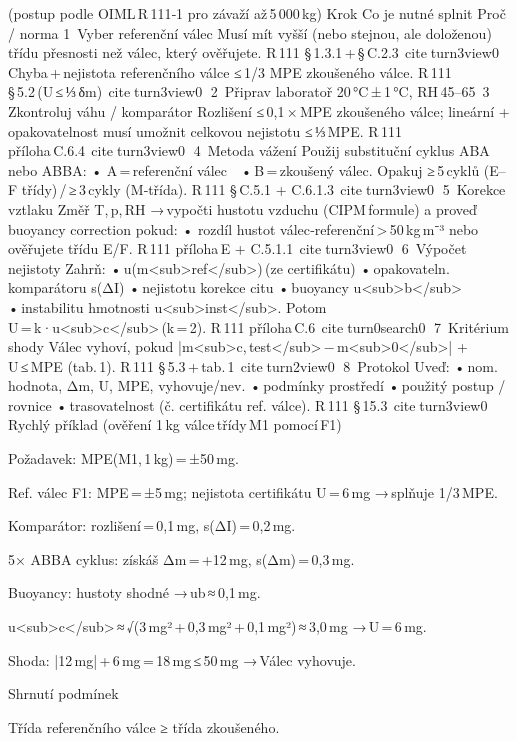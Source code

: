 (postup podle OIML R 111‑1 pro závaží až 5 000 kg)
Krok	Co je nutné splnit	Proč / norma
1  Vyber referenční válec	Musí mít vyšší (nebo stejnou, ale doloženou) třídu přesnosti než válec, který ověřujete.	R 111 § 1.3.1 + § C.2.3 citeturn3view0
	Chyba + nejistota referenčního válce ≤ 1/3 MPE zkoušeného válce.	R 111 § 5.2 (U ≤ ⅓ δm) citeturn3view0
2  Připrav laboratoř	20 °C ± 1 °C, RH 45–65 %
3  Zkontroluj váhu / komparátor	Rozlišení ≤ 0,1 × MPE zkoušeného válce; lineární + opakovatelnost musí umožnit celkovou nejistotu ≤ ⅓ MPE.	R 111 příloha C.6.4 citeturn3view0
4  Metoda vážení	Použij substituční cyklus ABA nebo ABBA:
• A = referenční válec • B = zkoušený válec.
Opakuj ≥ 5 cyklů (E–F třídy) / ≥ 3 cykly (M‑třída).	R 111 § C.5.1 + C.6.1.3 citeturn3view0
5  Korekce vztlaku	Změř T, p, RH → vypočti hustotu vzduchu (CIPM formule) a proveď buoyancy correction pokud:
• rozdíl hustot válec‑referenční > 50 kg m⁻³ nebo ověřujete třídu E/F.	R 111 příloha E + C.5.1.1 citeturn3view0
6  Výpočet nejistoty	Zahrň:
• u(m<sub>ref</sub>) (ze certifikátu)
• opakovateln. komparátoru s(ΔI)
• nejistotu korekce citu
• buoyancy u<sub>b</sub>
• instabilitu hmotnosti u<sub>inst</sub>.
Potom U = k·u<sub>c</sub> (k = 2).	R 111 příloha C.6 citeturn0search0
7  Kritérium shody	Válec vyhoví, pokud |m<sub>c, test</sub> − m<sub>0</sub>| + U ≤ MPE (tab. 1).	R 111 § 5.3 + tab. 1 citeturn2view0
8  Protokol	Uveď:
• nom. hodnota, Δm, U, MPE, vyhovuje/nev.
• podmínky prostředí
• použitý postup / rovnice
• trasovatelnost (č. certifikátu ref. válce).	R 111 § 15.3 citeturn3view0
Rychlý příklad (ověření 1 kg válce třídy M1 pomocí F1)

    Požadavek: MPE(M1, 1 kg) = ±50 mg.

    Ref. válec F1: MPE = ±5 mg; nejistota certifikátu U = 6 mg → splňuje 1/3 MPE.

    Komparátor: rozlišení = 0,1 mg, s(ΔI) = 0,2 mg.

    5× ABBA cyklus: získáš Δm = +12 mg, s(Δm) = 0,3 mg.

    Buoyancy: hustoty shodné → ub ≈ 0,1 mg.

    u<sub>c</sub> ≈ √(3 mg² + 0,3 mg² + 0,1 mg²) ≈ 3,0 mg → U = 6 mg.

    Shoda: |12 mg| + 6 mg = 18 mg ≤ 50 mg → Válec vyhovuje.

Shrnutí podmínek

    Třída referenčního válce ≥ třída zkoušeného.

